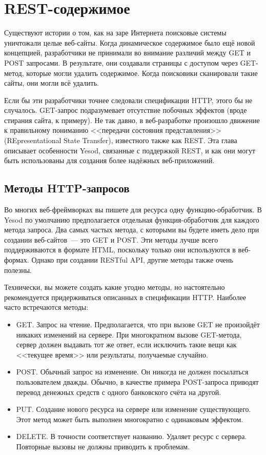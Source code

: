 \chapter{REST-содержимое}\label{chap:restful-content}

Существуют истории о том, как  на заре Интернета поисковые системы уничтожали
целые веб-сайты. Когда динамическое содержимое было ещё новой концепцией,
разработчики не принимали во внимание различий между GET и POST запросами. В
результате, они создавали страницы с доступом через GET-метод, которые могли
удалить содержимое. Когда поисковики сканировали такие сайты, они могли всё
удалить.

Если бы эти разработчики точнее следовали спецификации HTTP, этого бы не
случалось.  GET-запрос подразумевает отсутствие побочных эффектов (вроде
стирания сайта, к примеру).  Не так давно, в веб-разработке произошло движение
к правильному пониманию <<передачи состояния представления>> (REpresentational
State Transfer), известного также как REST.  Эта глава описывает особенности
Yesod, связанные с поддержкой REST, и как они могут быть использованы для
создания более надёжных веб-приложений.

\section{Методы HTTP-запросов}

Во многих веб-фреймворках вы пишете для ресурса одну функцию-обработчик. В
Yesod по умолчанию предполагается отдельная функция-обработчик для каждого
метода запроса. Два самых частых метода, с которыми вы будете иметь дело при
создании веб-сайтов~--- это GET и POST. Эти методы лучше всего поддерживаются в
формате HTML, поскольку только они используются в веб-формах. Однако при
создании RESTful API, другие методы также очень полезны.

Технически, вы можете создать какие угодно методы, но настоятельно
рекомендуется придерживаться описанных в спецификации HTTP. Наиболее часто
встречаются методы:
\begin{itemize}
    \item GET. Запрос на чтение. Предполагается, что при вызове GET не
        произойдёт никаких изменений на сервере. При многократном вызове
        GET-метода, сервер должен выдавать тот же ответ, если исключить такие
        вещи как <<текущее время>> или результаты, получаемые случайно.
    \item POST. Обычный запрос на изменение. Он никогда не должен посылаться
        пользователем дважды. Обычно, в качестве примера POST-запроса приводят
        перевод денежных средств с одного банковского счёта на другой.
    \item PUT. Создание нового ресурса на сервере или изменение существующего.
        Этот метод может быть выполнен многократно с одинаковым эффектом.
    \item DELETE. В точности соответствует названию. Удаляет ресурс с сервера.
        Повторные вызовы не должны приводить к проблемам.
\end{itemize}

